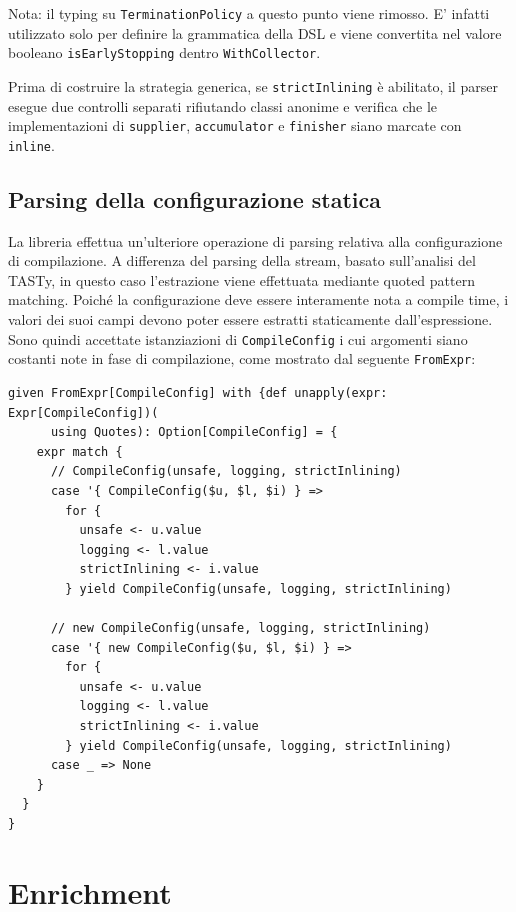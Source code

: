 \documentclass[a4paper,11pt]{report}
\theoremstyle{definition}
\begin{document}
Nota: il typing su \texttt{TerminationPolicy} a questo punto viene rimosso. E' infatti utilizzato solo per definire la grammatica della DSL e viene convertita nel valore booleano \texttt{isEarlyStopping} dentro \texttt{WithCollector}.

Prima di costruire la strategia generica, se \texttt{strictInlining} è abilitato, il parser esegue due controlli separati rifiutando classi anonime e verifica che le implementazioni di \texttt{supplier}, \texttt{accumulator} e \texttt{finisher} siano marcate con \texttt{inline}.

\subsection{Parsing della configurazione statica}
La libreria effettua un'ulteriore operazione di parsing relativa alla configurazione di compilazione. A differenza del parsing della stream, basato sull'analisi del TASTy, in questo caso l'estrazione viene effettuata mediante quoted pattern matching. Poiché la configurazione deve essere interamente nota a compile time, i valori dei suoi campi devono poter essere estratti staticamente dall'espressione. Sono quindi accettate istanziazioni di \texttt{CompileConfig} i cui argomenti siano costanti note in fase di compilazione, come mostrato dal seguente \texttt{FromExpr}:

\noindent
\begin{minipage}{\linewidth}
  \begin{lstlisting}[caption={Unapplier con quoted pattern matching per configurazione statica}]
given FromExpr[CompileConfig] with {def unapply(expr: Expr[CompileConfig])(
      using Quotes): Option[CompileConfig] = {
    expr match {
      // CompileConfig(unsafe, logging, strictInlining)
      case '{ CompileConfig($u, $l, $i) } =>
        for {
          unsafe <- u.value
          logging <- l.value
          strictInlining <- i.value
        } yield CompileConfig(unsafe, logging, strictInlining)

      // new CompileConfig(unsafe, logging, strictInlining)
      case '{ new CompileConfig($u, $l, $i) } =>
        for {
          unsafe <- u.value
          logging <- l.value
          strictInlining <- i.value
        } yield CompileConfig(unsafe, logging, strictInlining)
      case _ => None
    }
  }
}
\end{lstlisting}
\end{minipage}

\section{Enrichment}
\label{sec:enrichment}
\end{document}
